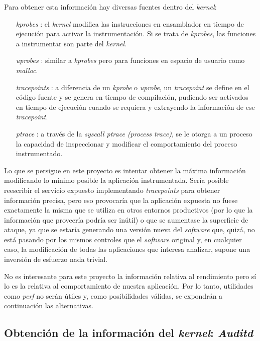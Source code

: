 Para obtener esta información hay diversas fuentes dentro del \emph{kernel}:

\begin{enumerate}
    \item[\emph{kprobes}]: el \emph{kernel} modifica las instrucciones en ensamblador en tiempo de ejecución para activar la instrumentación. Si se trata
    de \emph{kprobes}, las funciones a instrumentar son parte del \emph{kernel}. 
    \item[\emph{uprobes}]: similar a \emph{kprobes} pero para funciones en espacio de usuario como \emph{malloc}.
    \item[\emph{tracepoints}]: a diferencia de un \emph{kprobe} o \emph{uprobe}, un \emph{tracepoint} se define en el código fuente y se genera en tiempo de compilación, pudiendo ser activados en tiempo de ejecución cuando se requiera y extrayendo la información de ese \emph{tracepoint}.
    \item[\emph{ptrace}]: a través de la \emph{syscall ptrace (process trace)}, se le otorga a un proceso la capacidad de inspeccionar y modificar el comportamiento del proceso instrumentado. 
\end{enumerate}

Lo que se persigue en este proyecto es intentar obtener la máxima información modificando lo mínimo posible la aplicación instrumentada. Sería posible
reescribir el servicio expuesto implementando \emph{tracepoints} para obtener información precisa, pero eso provocaría que la aplicación expuesta no fuese exactamente la misma que se utiliza
en otros entornos productivos (por lo que la información que proveería podría ser inútil) o que se aumentase la superficie de ataque, ya que se estaría
generando una versión nueva del \emph{software} que, quizá, no está pasando por los mismos controles que el \emph{software} original y, en cualquier caso, la modificación de todas las aplicaciones
que interesa analizar, supone una inversión de esfuerzo nada trivial.

No es interesante para este proyecto la información relativa al rendimiento pero sí lo es la relativa al comportamiento de nuestra aplicación. Por lo tanto,
utilidades como \emph{perf} no serán útiles y, como posibilidades válidas, se expondrán a continuación las alternativas.

\subsection{Obtención de la información del \emph{kernel}: \emph{Auditd}}
\label{subsec:auditd}

